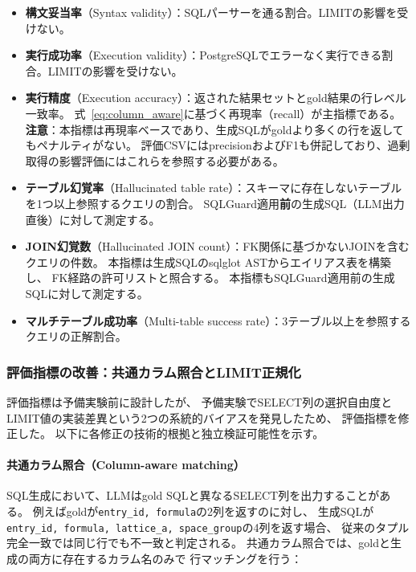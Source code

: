\documentclass[5p,twocolumn]{elsarticle}
\begin{document}
\begin{itemize}
  \item \textbf{構文妥当率}（Syntax validity）：SQLパーサーを通る割合。LIMITの影響を受けない。
  \item \textbf{実行成功率}（Execution validity）：PostgreSQLでエラーなく実行できる割合。LIMITの影響を受けない。
  \item \textbf{実行精度}（Execution accuracy）：返された結果セットとgold結果の行レベル一致率。
    式~\eqref{eq:column_aware}に基づく再現率（recall）が主指標である。
    \textbf{注意}：本指標は再現率ベースであり、生成SQLがgoldより多くの行を返してもペナルティがない。
    評価CSVにはprecisionおよびF1も併記しており、過剰取得の影響評価にはこれらを参照する必要がある。
  \item \textbf{テーブル幻覚率}（Hallucinated table rate）：スキーマに存在しないテーブルを1つ以上参照するクエリの割合。
    SQLGuard適用\textbf{前}の生成SQL（LLM出力直後）に対して測定する。
  \item \textbf{JOIN幻覚数}（Hallucinated JOIN count）：FK関係に基づかないJOINを含むクエリの件数。
    本指標は生成SQLのsqlglot ASTからエイリアス表を構築し、
    FK経路の許可リストと照合する。
    本指標もSQLGuard適用前の生成SQLに対して測定する。
  \item \textbf{マルチテーブル成功率}（Multi-table success rate）：3テーブル以上を参照するクエリの正解割合。
\end{itemize}

\subsubsection{評価指標の改善：共通カラム照合とLIMIT正規化}
\label{sec:metric_improvements}

評価指標は予備実験前に設計したが、
予備実験でSELECT列の選択自由度とLIMIT値の実装差異という2つの系統的バイアスを発見したため、
評価指標を修正した。
以下に各修正の技術的根拠と独立検証可能性を示す。

\paragraph{共通カラム照合（Column-aware matching）}
SQL生成において、LLMはgold SQLと異なるSELECT列を出力することがある。
例えばgoldが\texttt{entry\_id, formula}の2列を返すのに対し、
生成SQLが\texttt{entry\_id, formula, lattice\_a, space\_group}の4列を返す場合、
従来のタプル完全一致では同じ行でも不一致と判定される。
共通カラム照合では、goldと生成の両方に存在するカラム名のみで
行マッチングを行う：
\end{document}
